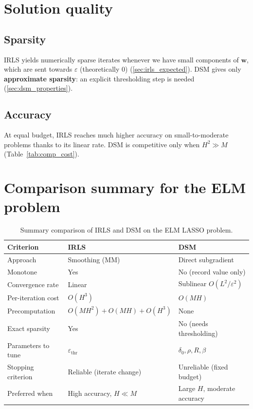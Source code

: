\section{Solution quality}
\label{sec:comp_quality}

\subsection{Sparsity}

IRLS yields numerically sparse iterates whenever we have small components of $\mathbf{w}$, which are sent towards $\varepsilon$ (theoretically $0$) (\ref{sec:irls_expected}). DSM gives only
\textbf{approximate sparsity}: an explicit thresholding step is needed
(\ref{sec:dsm_properties}).

\subsection{Accuracy}

At equal budget, IRLS reaches much higher accuracy on small-to-moderate
problems thanks to its linear rate. DSM is competitive only when
$H^2 \gg M$ (Table~\ref{tab:comp_cost}).

\section{Comparison summary for the ELM problem}
\label{sec:comp_summary}

\begin{table}[htbp]
\centering
\begin{tabular}{lll}
\toprule
\textbf{Criterion} & \textbf{IRLS} & \textbf{DSM} \\
\midrule
Approach & Smoothing (MM) & Direct subgradient \\
Monotone & Yes & No (record value only) \\
Convergence rate & Linear & Sublinear $O(L^2/\varepsilon^2)$ \\
Per-iteration cost & $O(H^3)$ & $O(MH)$ \\
Precomputation & ${O(MH^2) + O(MH) + O(H^3)}$ & None \\
Exact sparsity & Yes & No (needs thresholding) \\
Parameters to tune & $\varepsilon_{\mathrm{thr}}$ & $\delta_0, \rho, R, \beta$ \\
Stopping criterion & Reliable (iterate change) & Unreliable (fixed budget) \\
Preferred when & High accuracy, $H \ll M$ & Large $H$, moderate accuracy \\
\bottomrule
\end{tabular}
\caption{Summary comparison of IRLS and DSM on the ELM LASSO problem.}
\label{tab:comp_summary}
\end{table}

